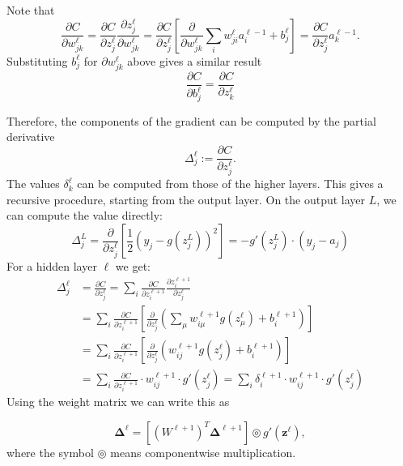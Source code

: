 \documentclass{article}
\newcommand{\vc}[1]{\boldsymbol{#1}}
\begin{document}
    Note that
    \[
        \frac{\partial C}{\partial w_{jk}^\ell} = 
        \frac{\partial C}{\partial z_j^\ell} 
        \frac{\partial z_j^\ell}{\partial w_{jk}^\ell} =
        \frac{\partial C}{\partial z_j^\ell} 
        \left[ \frac{\partial}{\partial w_{jk}^\ell} \sum_i w_{ji}^\ell a_{i}^{\ell-1} + b_j^\ell \right] = 
        \frac{\partial C}{\partial z_j^\ell} a_{k}^{\ell-1}.
    \]
    Substituting $b_j^\ell$ for $\partial w_{jk}^\ell$ above gives a similar result
    \[
        \frac{\partial C}{\partial b_{j}^\ell} = \frac{\partial C}{\partial z_k^\ell}
    \]

    Therefore, the components of the gradient can be computed by the partial derivative
    \[
        \Delta_j^\ell := \frac{\partial C}{\partial z_j^\ell}.   
    \]
    The values $\delta_k^\ell$ can be computed from those of the higher layers. 
    This gives a recursive procedure, starting from the output layer. 
    On the output layer $L$, we can compute the value directly:
    \[
       \Delta_j^L = \frac{\partial}{\partial z_j^\ell} 
       \left[\frac12 \left(y_j - g(z_j^L)\right)^2 \right] = 
       -g'(z_j^L) \cdot (y_j - a_j)
    \]
    For a hidden layer $\ell$ we get: 
    \begin{align*}
        \Delta_j^\ell &= \frac{\partial C}{\partial z_j^\ell} =
        \sum_i
        \frac{\partial C}{\partial z_i^{\ell+1}}
        \frac{\partial z_i^{\ell+1}}{\partial z_j^\ell} \\
        &= \sum_{i} 
        \frac{\partial C}{\partial z_i^{\ell+1}} \left[
        \frac{\partial}{\partial z_j^\ell} \left(\sum_\mu w_{i \mu}^{\ell+1} 
        g(z_\mu^\ell) + b_i^{\ell+1}\right) \right]\\
        &= \sum_{i} 
        \frac{\partial C}{\partial z_i^{\ell+1}} \left[
        \frac{\partial}{\partial z_j^\ell} \left(w_{i j}^{\ell+1} g(z_j^\ell) 
        + b_i^{\ell+1}
        \right) \right]\\
        &= \sum_{i} 
        \frac{\partial C}{\partial z_i^{\ell+1}}
        \cdot w_{i j}^{\ell+1} \cdot g'(z_j^\ell)
        = \sum_{i} 
        \delta_i^{\ell+1}
        \cdot w_{i j}^{\ell+1} \cdot g'(z_j^\ell)
    \end{align*}
    Using the weight matrix we can write this as 

    \begin{equation}
        \vc\Delta^\ell = \left[ (W^{\ell +1})^T \vc\Delta^{\ell +1} \right] \circledcirc g'(\vc z^\ell), 
    \end{equation}
    where the symbol $\circledcirc$ means componentwise multiplication.
\end{document}
